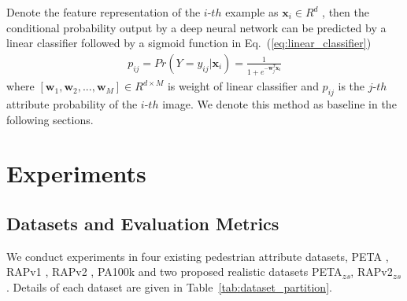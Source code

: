 \documentclass[runningheads]{llncs}
\begin{document}
Denote the feature representation of the $i$-$th$ example as $\mathbf{x}_i \in R^{d}$ , then the conditional probability output by a deep neural network can be predicted by a linear classifier followed by a sigmoid function in Eq.~(\ref{eq:linear_classifier})
\begin{align}
	p_{ij} = Pr(Y=y_{ij}|\mathbf{x}_i) = \frac{1}{1 + e^{{-\mathbf{w}^{T}_{j} \mathbf{x_i}}}}
	\label{eq:linear_classifier}
\end{align}
where $[\mathbf{w}_1, \mathbf{w}_2, ... , \mathbf{w}_M] \in R^{d \times M }$ is weight of linear classifier and $p_{ij}$ is the $j$-$th$ attribute probability of the $i$-$th$ image. We denote this method as baseline in the following sections.


\section{Experiments} \label{exp}

\subsection{Datasets and Evaluation Metrics}

We conduct experiments in four existing pedestrian attribute datasets, PETA \cite{deng2014pedestrian}, RAPv1 \cite{li2016richly}, RAPv2 \cite{li2018richly}, PA100k \cite{liu2017hydraplus} and two proposed realistic datasets PETA\textsubscript{$zs$}, RAPv2\textsubscript{$zs$}. Details of each dataset are given in Table~\ref{tab:dataset_partition}.
\end{document}
